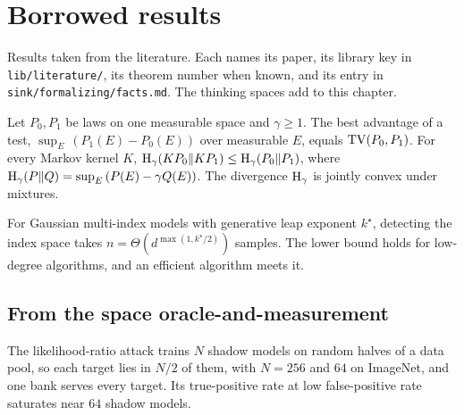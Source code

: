 \chapter{Borrowed results}\label{ch:borrowed}
Results taken from the literature. Each names its paper, its library key in
\texttt{lib/literature/}, its theorem number when known, and its entry in
\texttt{sink/formalizing/facts.md}. The thinking spaces add to this chapter.

\begin{borrowed}
Let $P_0,P_1$ be laws on one measurable space and $\gamma\ge1$. The best advantage
of a test, $\sup_E\,(P_1(E)-P_0(E))$ over measurable $E$, equals $\mathrm{TV}(P_0,P_1)$. For
every Markov kernel $K$, $\mathrm{H}_\gamma(KP_0\|KP_1)\le\mathrm{H}_\gamma(P_0\|P_1)$, where
$\mathrm{H}_\gamma(P\|Q)=\sup_E\,(P(E)-\gamma Q(E))$. The divergence $\mathrm{H}_\gamma$ is jointly convex
under mixtures.
\end{borrowed}

\begin{borrowed}
For Gaussian multi-index models with generative leap exponent $k^\star$, detecting the
index space takes $n=\Theta(d^{\max(1,k^\star/2)})$ samples. The lower bound holds
for low-degree algorithms, and an efficient algorithm meets it.
\end{borrowed}

\section{From the space oracle-and-measurement}

\begin{borrowed}
The likelihood-ratio attack trains $N$ shadow models on random halves of a data
pool, so each target lies in $N/2$ of them, with $N=256$ and $64$ on ImageNet, and
one bank serves every target. Its true-positive rate at low false-positive rate
saturates near $64$ shadow models.
\end{borrowed}

